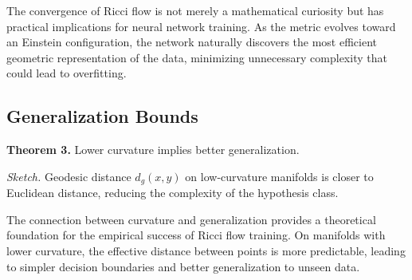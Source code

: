 \documentclass[12pt,a4paper]{article}
\begin{document}
The convergence of Ricci flow is not merely a mathematical curiosity but has practical implications for neural network training. As the metric evolves toward an Einstein configuration, the network naturally discovers the most efficient geometric representation of the data, minimizing unnecessary complexity that could lead to overfitting.

\subsection{Generalization Bounds}

\textbf{Theorem 3.} Lower curvature implies better generalization.

\textit{Sketch.} Geodesic distance $d_g(x, y)$ on low-curvature manifolds is closer to Euclidean distance, reducing the complexity of the hypothesis class.

The connection between curvature and generalization provides a theoretical foundation for the empirical success of Ricci flow training. On manifolds with lower curvature, the effective distance between points is more predictable, leading to simpler decision boundaries and better generalization to unseen data.
\end{document}
